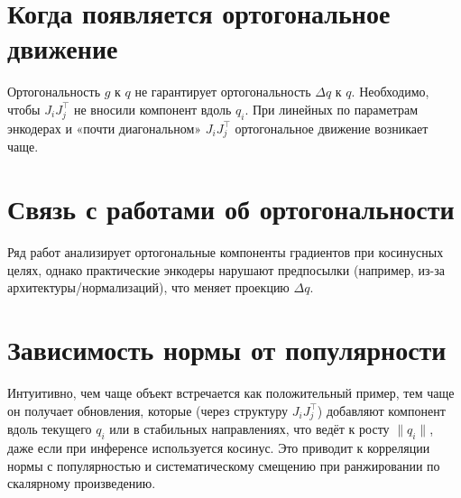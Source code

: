 \section{Когда появляется ортогональное движение}
Ортогональность \(g\) к \(q\) не гарантирует ортогональность \(\Delta q\) к \(q\). Необходимо, чтобы \(J_i J_j^{\top}\) не вносили компонент вдоль \(q_i\). При линейных по параметрам энкодерах и «почти диагональном» \(J_i J_j^{\top}\) ортогональное движение возникает чаще.

\section{Связь с работами об ортогональности}
Ряд работ анализирует ортогональные компоненты градиентов при косинусных целях, однако практические энкодеры нарушают предпосылки (например, из-за архитектуры/нормализаций), что меняет проекцию \(\Delta q\).

\section{Зависимость нормы от популярности}
Интуитивно, чем чаще объект встречается как положительный пример, тем чаще он получает обновления, которые (через структуру \(J_i J_j^{\top}\)) добавляют компонент вдоль текущего \(q_i\) или в стабильных направлениях, что ведёт к росту \(\|q_i\|\), даже если при инференсе используется косинус. Это приводит к корреляции нормы с популярностью и систематическому смещению при ранжировании по скалярному произведению.
